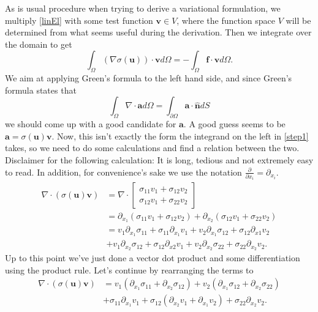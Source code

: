 \documentclass[paper=a4, fontsize=11pt]{scrartcl} %
\begin{document}
As is usual procedure when trying to derive a variational formulation, we multiply \ref{linEl} with some test function $\boldsymbol{v}\in V$, where the function space $V$ will be determined from what seems useful during the derivation. Then we integrate over the domain to get
\begin{equation}
\label{step1}
\int_{\Omega} (\nabla \sigma(\boldsymbol{u}))\cdot \boldsymbol{v}d\Omega = -\int_{\Omega}\boldsymbol{f}\cdot \boldsymbol{v} d\Omega .
\end{equation}
We aim at applying Green's formula to the left hand side, and since Green's formula states that
\begin{equation*}
\int_{\Omega}\nabla \cdot \boldsymbol{a}d\Omega = \int_{\partial \Omega} \boldsymbol{a}\cdot \boldsymbol{\hat{n}}dS 
\end{equation*}
we should come up with a good candidate for $\boldsymbol{a}$. A good guess seems to be $\boldsymbol{a} = \sigma(\boldsymbol{u})\boldsymbol{v}$. Now, this isn't exactly the form the integrand on the left in \ref{step1} takes, so we need to do some calculations and find a relation between the two. Disclaimer for the following calculation: It is long, tedious and not extremely easy to read. In addition, for convenience's sake we use the notation $\frac{\partial}{\partial x_i} = \partial_{x_i}$.
\begin{align*}
\nabla \cdot (\sigma(\boldsymbol{u})\boldsymbol{v}) &= \nabla \cdot \begin{bmatrix}
\sigma_{11}v_1 + \sigma_{12}v_2 \\
\sigma_{12}v_1 + \sigma_{22}v_2
\end{bmatrix}\\
&= \partial_{x_1}(\sigma_{11}v_1 + \sigma_{12}v_2) + \partial_{x_2}(\sigma_{12}v_1 + \sigma_{22}v_2) \\
&= v_1\partial_{x_1}\sigma_{11} + \sigma_{11}\partial_{x_1}v_1 + v_2\partial_{x_1}\sigma_{12} + \sigma_{12}\partial_{x1}v_2  \\
&+ v_1\partial_{x_2}\sigma_{12} + \sigma_{12}\partial_{x2}v_1 + v_2\partial_{x_2}\sigma_{22} + \sigma_{22}\partial_{x_2}v_2 .
\end{align*}
Up to this point we've just done a vector dot product and some differentiation using the product rule. Let's continue by rearranging the terms to
\begin{align*}
\nabla \cdot (\sigma(\boldsymbol{u})\boldsymbol{v})&= v_1(\partial_{x_1}\sigma_{11} + \partial_{x_2}\sigma_{12}) + v_2(\partial_{x_1}\sigma_{12} + \partial_{x_2}\sigma_{22}) \\
&+ \sigma_{11}\partial_{x_1}v_1 + \sigma_{12}(\partial_{x_2}v_1+\partial_{x_1}v_2)+\sigma_{22}\partial_{x_2}v_2 .
\end{align*}
\end{document}
